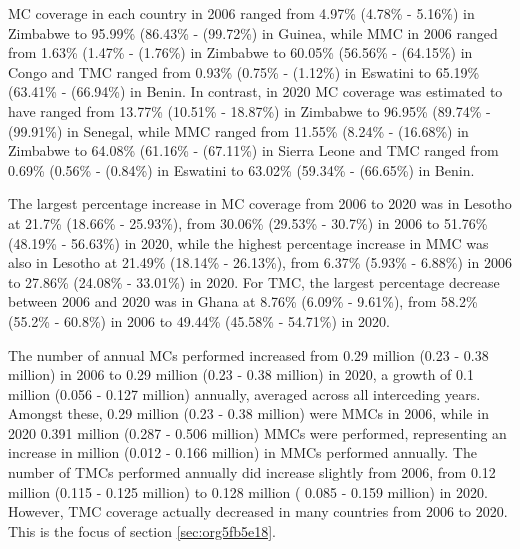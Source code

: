 \documentclass{article}
\begin{document}
MC coverage in each country in 2006 ranged from 4.97\% (4.78\% - 5.16\%) in Zimbabwe to 95.99\% (86.43\% -
(99.72\%) in Guinea, while MMC in 2006 ranged from 1.63\% (1.47\% - (1.76\%) in Zimbabwe to 60.05\% (56.56\%
- (64.15\%) in Congo and TMC ranged from 0.93\% (0.75\% - (1.12\%) in Eswatini to 65.19\% (63.41\% - (66.94\%)
in Benin. In contrast, in 2020 MC coverage was estimated to have ranged from 13.77\% (10.51\% - 18.87\%) in
Zimbabwe to 96.95\% (89.74\% - (99.91\%) in Senegal, while MMC ranged from 11.55\% (8.24\% - (16.68\%) in
Zimbabwe to 64.08\% (61.16\% - (67.11\%) in Sierra Leone and TMC ranged from 0.69\% (0.56\% - (0.84\%) in
Eswatini to 63.02\% (59.34\% - (66.65\%) in Benin.

The largest percentage increase in MC coverage from 2006 to 2020 was in Lesotho at 21.7\% (18.66\% - 25.93\%),
from 30.06\% (29.53\% - 30.7\%) in 2006 to 51.76\% (48.19\% - 56.63\%) in 2020, while the highest percentage
increase in MMC was also in Lesotho at 21.49\% (18.14\% - 26.13\%), from 6.37\% (5.93\% - 6.88\%) in 2006 to
27.86\% (24.08\% - 33.01\%) in 2020. For TMC, the largest percentage decrease between 2006 and 2020 was in
Ghana at 8.76\% (6.09\% - 9.61\%), from 58.2\% (55.2\% - 60.8\%) in 2006 to 49.44\% (45.58\% - 54.71\%) in 2020.

The number of annual MCs performed increased from 0.29 million (0.23 - 0.38 million) in 2006 to 0.29 million
(0.23 - 0.38 million) in 2020, a growth of 0.1 million (0.056 - 0.127 million) annually, averaged across all
interceding years. Amongst these, 0.29 million (0.23 - 0.38 million) were MMCs in 2006, while in 2020 0.391
million (0.287 - 0.506 million) MMCs were performed, representing an increase in million (0.012 - 0.166
million) in MMCs performed annually. The number of TMCs performed annually did increase slightly from
2006, from 0.12 million (0.115 - 0.125 million) to 0.128 million ( 0.085 - 0.159 million) in 2020. However,
TMC coverage actually decreased in many countries from 2006 to 2020. This is the focus of section \ref{sec:org5fb5e18}.
\end{document}
